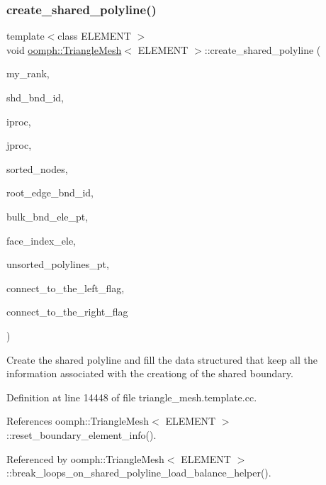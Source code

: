 \subsubsection{\texorpdfstring{create\+\_\+shared\+\_\+polyline()}{create\_shared\_polyline()}}
{\footnotesize\ttfamily template$<$class E\+L\+E\+M\+E\+NT $>$ \\
void \hyperlink{classoomph_1_1TriangleMesh}{oomph\+::\+Triangle\+Mesh}$<$ E\+L\+E\+M\+E\+NT $>$\+::create\+\_\+shared\+\_\+polyline (\begin{DoxyParamCaption}\item[{const unsigned \&}]{my\+\_\+rank,  }\item[{const unsigned \&}]{shd\+\_\+bnd\+\_\+id,  }\item[{const unsigned \&}]{iproc,  }\item[{const unsigned \&}]{jproc,  }\item[{std\+::list$<$ Node $\ast$$>$ \&}]{sorted\+\_\+nodes,  }\item[{const int \&}]{root\+\_\+edge\+\_\+bnd\+\_\+id,  }\item[{Vector$<$ Finite\+Element $\ast$$>$ \&}]{bulk\+\_\+bnd\+\_\+ele\+\_\+pt,  }\item[{Vector$<$ int $>$ \&}]{face\+\_\+index\+\_\+ele,  }\item[{Vector$<$ Vector$<$ Triangle\+Mesh\+Poly\+Line $\ast$$>$ $>$ \&}]{unsorted\+\_\+polylines\+\_\+pt,  }\item[{const int \&}]{connect\+\_\+to\+\_\+the\+\_\+left\+\_\+flag,  }\item[{const int \&}]{connect\+\_\+to\+\_\+the\+\_\+right\+\_\+flag }\end{DoxyParamCaption})\hspace{0.3cm}{\ttfamily [protected]}}



Create the shared polyline and fill the data structured that keep all the information associated with the creationg of the shared boundary. 



Definition at line 14448 of file triangle\+\_\+mesh.\+template.\+cc.



References oomph\+::\+Triangle\+Mesh$<$ E\+L\+E\+M\+E\+N\+T $>$\+::reset\+\_\+boundary\+\_\+element\+\_\+info().



Referenced by oomph\+::\+Triangle\+Mesh$<$ E\+L\+E\+M\+E\+N\+T $>$\+::break\+\_\+loops\+\_\+on\+\_\+shared\+\_\+polyline\+\_\+load\+\_\+balance\+\_\+helper().

